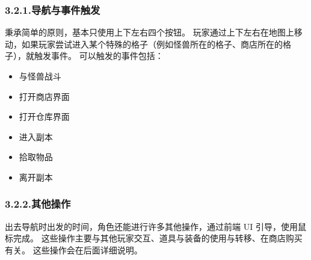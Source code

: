 \documentclass{article}
\begin{document}
\subsubsection{3.2.1.\hspace*{0.5em}导航与事件触发}\label{321}%

\noindent{}秉承简单的原则，基本只使用上下左右四个按钮。 玩家通过上下左右在地图上移动，如果玩家尝试进入某个特殊的格子（例如怪兽所在的格子、商店所在的格子），就触发事件。 可以触发的事件包括：%

\begin{itemize}[noitemsep,topsep=\mdcompacttopsep]%

\item{}与怪兽战斗%

\item{}打开商店界面%

\item{}打开仓库界面%

\item{}进入副本%

\item{}拾取物品%

\item{}离开副本%
\end{itemize}%

\subsubsection{3.2.2.\hspace*{0.5em}其他操作}\label{322}%

\noindent{}出去导航时出发的时间，角色还能进行许多其他操作，通过前端 UI 引导，使用鼠标完成。 这些操作主要与其他玩家交互、道具与装备的使用与转移、在商店购买有关。 这些操作会在后面详细说明。%
\end{document}
